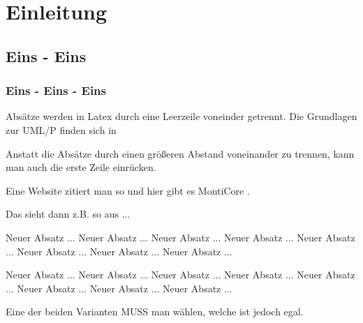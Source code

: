 \chapter{Einleitung}
\section{Eins - Eins}
\subsection{Eins - Eins - Eins}


Absätze werden in Latex durch eine Leerzeile voneinder getrennt. Die Grundlagen zur UML/P finden sich in \cite{Rum11}

Anstatt die Absätze durch einen größeren Abstand voneinander zu trennen, kann man auch die erste Zeile einrücken.

Eine Website zitiert man so \cite{SE10} und hier gibt es MontiCore \cite{Mon10}. 

Das sieht dann z.B. so aus ...
\setlength{\parindent}{3ex}
\setlength{\parskip}{0ex}

Neuer Absatz ... Neuer Absatz ... Neuer Absatz ... Neuer Absatz ... Neuer Absatz ... Neuer Absatz ... Neuer Absatz ... Neuer Absatz ...

Neuer Absatz ... Neuer Absatz ... Neuer Absatz ... Neuer Absatz ... Neuer Absatz ... Neuer Absatz ... Neuer Absatz ... Neuer Absatz ...

Eine der beiden Varianten MUSS man wählen, welche ist jedoch egal.

\cleardoublepage
